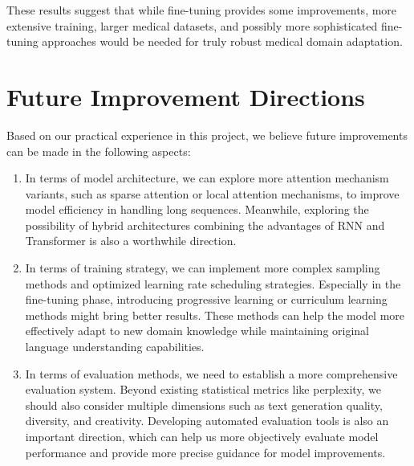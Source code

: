 \documentclass[12pt,oneside]{article}
\begin{document}
These results suggest that while fine-tuning provides some improvements, more extensive training, larger medical datasets, and possibly more sophisticated fine-tuning approaches would be needed for truly robust medical domain adaptation.

\section{Future Improvement Directions}

Based on our practical experience in this project, we believe future improvements can be made in the following aspects:

\begin{enumerate}
\item In terms of model architecture, we can explore more attention mechanism variants, such as sparse attention or local attention mechanisms, to improve model efficiency in handling long sequences. Meanwhile, exploring the possibility of hybrid architectures combining the advantages of RNN and Transformer is also a worthwhile direction.

\item In terms of training strategy, we can implement more complex sampling methods and optimized learning rate scheduling strategies. Especially in the fine-tuning phase, introducing progressive learning or curriculum learning methods might bring better results. These methods can help the model more effectively adapt to new domain knowledge while maintaining original language understanding capabilities.

\item In terms of evaluation methods, we need to establish a more comprehensive evaluation system. Beyond existing statistical metrics like perplexity, we should also consider multiple dimensions such as text generation quality, diversity, and creativity. Developing automated evaluation tools is also an important direction, which can help us more objectively evaluate model performance and provide more precise guidance for model improvements.
\end{enumerate}
\end{document}

